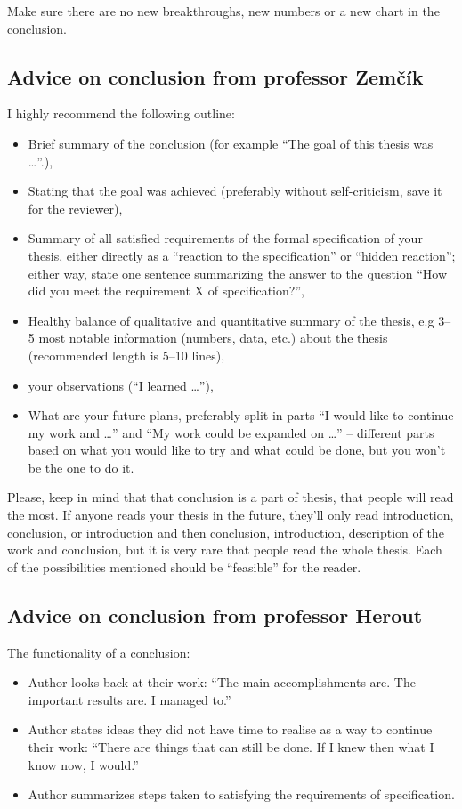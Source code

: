 {{Make sure there are no new breakthroughs, new numbers or a new chart in the conclusion.

\subsection*{Advice on conclusion from professor Zemčík}

I highly recommend the following outline:
\begin{itemize}
  \item{Brief summary of the conclusion (for example ``The goal of this thesis was \ldots''.),}
  \item{Stating that the goal was achieved (preferably without self-criticism, save it for the reviewer),}
  \item{Summary of all satisfied requirements of the formal specification of your thesis, either directly as a ``reaction to the specification'' or ``hidden reaction''; either way, state one sentence summarizing the answer to the question ``How did you meet the requirement X of specification?'',}
  \item{Healthy balance of qualitative and quantitative summary of the thesis, e.g 3--5 most notable information (numbers, data, etc.) about the thesis (recommended length is 5--10 lines),}
  \item{your observations (``I learned \ldots''),}
  \item{What are your future plans, preferably split in parts ``I would like to continue my work and \ldots'' and ``My work could be expanded on \ldots'' -- different parts based on what you would like to try and what could be done, but you won't be the one to do it.}
\end{itemize}

Please, keep in mind that that conclusion is a part of thesis, that people will read the most. If anyone reads your thesis in the future, they'll only read introduction, conclusion, or introduction and then conclusion, introduction, description of the work and conclusion, but it is very rare that people read the whole thesis. Each of the possibilities mentioned should be ``feasible'' for the reader.


\subsection*{Advice on conclusion from professor Herout}
The functionality of a conclusion:

\begin{itemize}
  \item{Author looks back at their work: ``The main accomplishments are. The important results are. I managed to.''}
  \item{Author states ideas they did not have time to realise as a way to continue their work: ``There are things that can still be done. If I knew then what I know now, I would.''}
  \item{Author summarizes steps taken to satisfying the requirements of specification.}
\end{itemize}

}}
